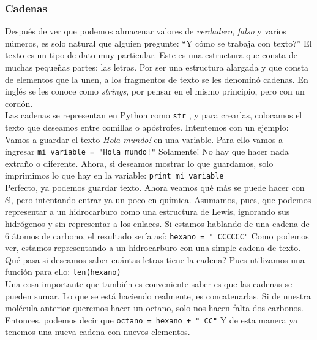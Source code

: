 \documentclass[10pt,letterpaper]{article}
\newcommand{\inlinecode}[1]{
\colorbox{light-gray}{\texttt{#1}}
}
\begin{document}
\subsubsection{Cadenas}
Despu\'es de ver que podemos almacenar valores de \emph{verdadero}, \emph{falso} y varios n\'umeros, es solo natural que alguien pregunte: ``Y c\'omo se trabaja con texto?'' El texto es un tipo de dato muy particular. Este es una estructura que consta de muchas peque\~nas partes: las letras. Por ser una estructura alargada y que consta de elementos que la unen, a los fragmentos de texto se les denomin\'o cadenas. En ingl\'es se les conoce como \emph{strings}, por pensar en el mismo principio, pero con un cord\'on.\\

Las cadenas se representan en Python como \inlinecode{str}, y para crearlas, colocamos el texto que deseamos entre comillas o ap\'ostrofes. Intentemos con un ejemplo: Vamos a guardar el texto \textit{Hola mundo!} en una variable. Para ello vamos a ingresar \inlinecode{mi\_variable = "Hola mundo!"} Solamente! No hay que hacer nada extra\~no o diferente. Ahora, si deseamos mostrar lo que guardamos, solo imprimimos lo que hay en la variable: \inlinecode{print mi\_variable}\\

Perfecto, ya podemos guardar texto. Ahora veamos qu\'e m\'as se puede hacer con \'el, pero intentando entrar ya un poco en qu\'imica. Asumamos, pues, que podemos representar a un hidrocarburo como una estructura de Lewis, ignorando sus hidr\'ogenos y sin representar a los enlaces. Si estamos hablando de una cadena de 6 \'atomos de carbono, el resultado ser\'ia as\'i: \inlinecode{hexano = "\ \hspace{-2mm}CCCCCC"} Como podemos ver, estamos representando a un hidrocarburo con una simple cadena de texto. Qu\'e pasa si deseamos saber cu\'antas letras tiene la cadena? Pues utilizamos una funci\'on para ello: \inlinecode{len(hexano)}\\

Una cosa importante que tambi\'en es conveniente saber es que las cadenas se pueden sumar. Lo que se est\'a haciendo realmente, es concatenarlas. Si de nuestra mol\'ecula anterior queremos hacer un octano, solo nos hacen falta dos carbonos. Entonces, podemos decir que \inlinecode{octano = hexano + "\ \hspace{-2mm}CC"} Y de esta manera ya tenemos una nueva cadena con nuevos elementos.\\
\end{document}
